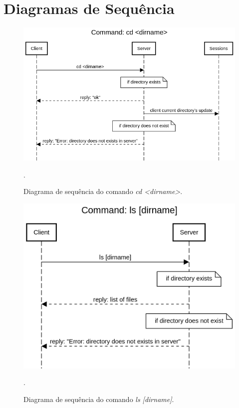 \documentclass[conference]{IEEEtran}
\begin{document}
\section{Diagramas de Sequência}

\begin{figure}[H]
\centering
\centerline{\includegraphics[scale=0.3]{diagrams/Command_cd_dirname.png}}
\caption{Diagrama de sequência do comando \textit{cd <dirname>}.}.
\label{cd}
\end{figure}

\begin{figure}[H]
\centering
\centerline{\includegraphics[scale=0.4]{diagrams/Command_ls_dirname.png}}
\caption{Diagrama de sequência do comando \textit{ls [dirname]}.}.
\label{ls}
\end{figure}
\end{document}
